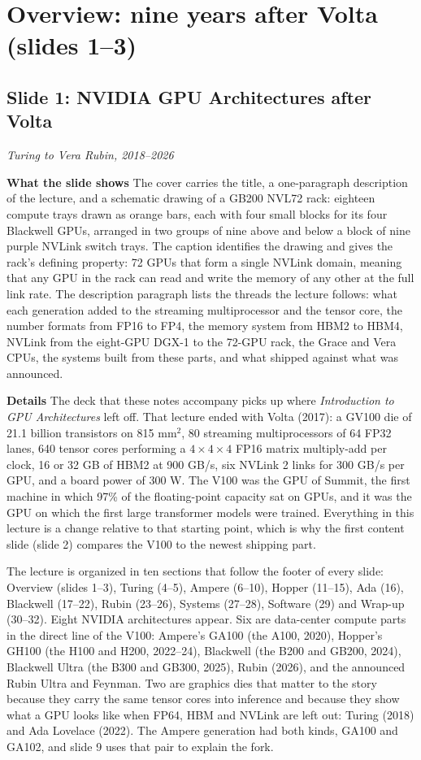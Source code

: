 \documentclass[11pt,letterpaper]{article}
\newcommand{\setstage}[1]{\colorlet{stagec}{#1}}
\newcommand{\slide}[3]{%
  \subsection[Slide #1: #2]{Slide #1: #2}%
  {\color{muted}\itshape #3\par}\medskip}
\newcommand{\para}[1]{\medskip\noindent\textbf{#1}\quad}
\begin{document}
\setstage{ink}
\section{Overview: nine years after Volta (slides 1--3)}

\slide{1}{NVIDIA GPU Architectures after Volta}{Turing to Vera Rubin, 2018--2026}

\para{What the slide shows} The cover carries the title, a one-paragraph description of the lecture, and a schematic drawing of a GB200 NVL72 rack: eighteen compute trays drawn as orange bars, each with four small blocks for its four Blackwell GPUs, arranged in two groups of nine above and below a block of nine purple NVLink switch trays. The caption identifies the drawing and gives the rack's defining property: 72 GPUs that form a single NVLink domain, meaning that any GPU in the rack can read and write the memory of any other at the full link rate. The description paragraph lists the threads the lecture follows: what each generation added to the streaming multiprocessor and the tensor core, the number formats from FP16 to FP4, the memory system from HBM2 to HBM4, NVLink from the eight-GPU DGX-1 to the 72-GPU rack, the Grace and Vera CPUs, the systems built from these parts, and what shipped against what was announced.

\para{Details} The deck that these notes accompany picks up where \emph{Introduction to GPU Architectures} left off. That lecture ended with Volta (2017): a GV100 die of 21.1 billion transistors on 815 mm$^2$, 80 streaming multiprocessors of 64 FP32 lanes, 640 tensor cores performing a $4\times4\times4$ FP16 matrix multiply-add per clock, 16 or 32 GB of HBM2 at 900 GB/s, six NVLink 2 links for 300 GB/s per GPU, and a board power of 300 W. The V100 was the GPU of Summit, the first machine in which 97\% of the floating-point capacity sat on GPUs, and it was the GPU on which the first large transformer models were trained. Everything in this lecture is a change relative to that starting point, which is why the first content slide (slide 2) compares the V100 to the newest shipping part.

The lecture is organized in ten sections that follow the footer of every slide: Overview (slides 1--3), Turing (4--5), Ampere (6--10), Hopper (11--15), Ada (16), Blackwell (17--22), Rubin (23--26), Systems (27--28), Software (29) and Wrap-up (30--32). Eight NVIDIA architectures appear. Six are data-center compute parts in the direct line of the V100: Ampere's GA100 (the A100, 2020), Hopper's GH100 (the H100 and H200, 2022--24), Blackwell (the B200 and GB200, 2024), Blackwell Ultra (the B300 and GB300, 2025), Rubin (2026), and the announced Rubin Ultra and Feynman. Two are graphics dies that matter to the story because they carry the same tensor cores into inference and because they show what a GPU looks like when FP64, HBM and NVLink are left out: Turing (2018) and Ada Lovelace (2022). The Ampere generation had both kinds, GA100 and GA102, and slide 9 uses that pair to explain the fork.
\end{document}
